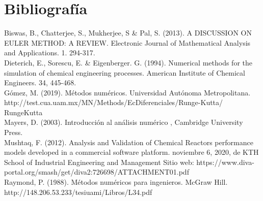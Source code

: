 \documentclass{article}
\begin{document}
 \section{Bibliografía}
 
 Biswas, B., Chatterjee, S., Mukherjee, S & Pal, S. (2013). A DISCUSSION ON EULER METHOD: A REVIEW. Electronic Journal of Mathematical Analysis and Applications. 1. 294-317.  \\
 
 
Dieterich, E., Sorescu, E. & Eigenberger. G. (1994). Numerical methods for the simulation of chemical engineering processes. American Institute of Chemical Engineers. 34, 445-468.\\


Gómez, M. (2019). Métodos numéricos. Universidad Autónoma Metropolitana. http://test.cua.uam.mx/MN/Methods/EcDiferenciales/Runge-Kutta/ RungeKutta\\


Mayers, D. (2003). Introducción al análisis numérico , Cambridge University Press.\\

Mushtaq, F. (2012). Analysis and Validation of Chemical Reactors performance models developed in a commercial software platform. noviembre 6, 2020, de KTH School of Industrial Engineering and Management Sitio web: https://www.diva-portal.org/smash/get/diva2:726698/ATTACHMENT01.pdf\\


Raymond, P. (1988). Métodos numéricos para ingenieros. McGraw Hill. \\
http://148.206.53.233/tesiuami/Libros/L34.pdf
\end{document}
